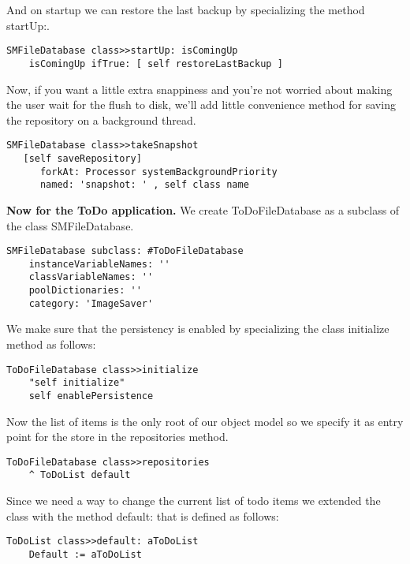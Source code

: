 \documentclass[a4paper,10pt,twoside]{book}
\newcommand{\ct}[1]{{\small\ttfamily\textup{#1}}}
\begin{document}
And on startup we can restore the last backup by specializing the method \ct{startUp:}.

\begin{lstlisting}
SMFileDatabase class>>startUp: isComingUp
    isComingUp ifTrue: [ self restoreLastBackup ]
\end{lstlisting}

Now, if you want a little extra snappiness and you're not worried about making the user wait for the flush to disk, we'll add little convenience method for saving the repository on a background thread.

\begin{lstlisting}
SMFileDatabase class>>takeSnapshot
   [self saveRepository]
      forkAt: Processor systemBackgroundPriority
      named: 'snapshot: ' , self class name
\end{lstlisting}

\textbf{Now for the ToDo application.} We create \ct{ToDoFileDatabase} as a subclass of the class \ct{SMFileDatabase}.

\begin{lstlisting}
SMFileDatabase subclass: #ToDoFileDatabase
    instanceVariableNames: ''
    classVariableNames: ''
    poolDictionaries: ''
    category: 'ImageSaver'
\end{lstlisting}

We make sure that the persistency is enabled by specializing the class \ct{initialize} method as follows:

\begin{lstlisting}
ToDoFileDatabase class>>initialize
    "self initialize"
    self enablePersistence
\end{lstlisting}

Now the list of items is the only root of our object model so we specify it as entry point for the store in the \ct{repositories} method.

\begin{lstlisting}
ToDoFileDatabase class>>repositories
    ^ ToDoList default
\end{lstlisting}
 
Since we need a way to change the current list of todo items we extended the class with the method \ct{default:} that is defined as follows:

\begin{lstlisting}
ToDoList class>>default: aToDoList
    Default := aToDoList
\end{lstlisting}
\end{document}
